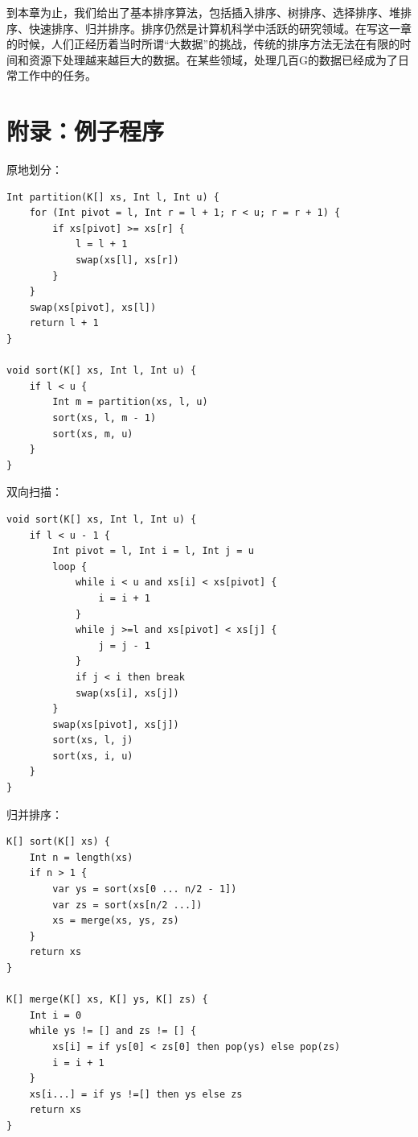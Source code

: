 \documentclass[b5paper]{ctexart}
\begin{document}
到本章为止，我们给出了基本排序算法，包括插入排序、树排序、选择排序、堆排序、快速排序、归并排序。排序仍然是计算机科学中活跃的研究领域。在写这一章的时候，人们正经历着当时所谓“大数据”的挑战，传统的排序方法无法在有限的时间和资源下处理越来越巨大的数据。在某些领域，处理几百G的数据已经成为了日常工作中的任务。

\begin{Exercise}
\end{Exercise}

\section{附录：例子程序}

原地划分：

\begin{lstlisting}[language = Bourbaki]
Int partition(K[] xs, Int l, Int u) {
    for (Int pivot = l, Int r = l + 1; r < u; r = r + 1) {
        if xs[pivot] >= xs[r] {
            l = l + 1
            swap(xs[l], xs[r])
        }
    }
    swap(xs[pivot], xs[l])
    return l + 1
}

void sort(K[] xs, Int l, Int u) {
    if l < u {
        Int m = partition(xs, l, u)
        sort(xs, l, m - 1)
        sort(xs, m, u)
    }
}
\end{lstlisting}

双向扫描：

\begin{lstlisting}[language = Bourbaki]
void sort(K[] xs, Int l, Int u) {
    if l < u - 1 {
        Int pivot = l, Int i = l, Int j = u
        loop {
            while i < u and xs[i] < xs[pivot] {
                i = i + 1
            }
            while j >=l and xs[pivot] < xs[j] {
                j = j - 1
            }
            if j < i then break
            swap(xs[i], xs[j])
        }
        swap(xs[pivot], xs[j])
        sort(xs, l, j)
        sort(xs, i, u)
    }
}
\end{lstlisting}

归并排序：

\begin{lstlisting}[language = Bourbaki]
K[] sort(K[] xs) {
    Int n = length(xs)
    if n > 1 {
        var ys = sort(xs[0 ... n/2 - 1])
        var zs = sort(xs[n/2 ...])
        xs = merge(xs, ys, zs)
    }
    return xs
}

K[] merge(K[] xs, K[] ys, K[] zs) {
    Int i = 0
    while ys != [] and zs != [] {
        xs[i] = if ys[0] < zs[0] then pop(ys) else pop(zs)
        i = i + 1
    }
    xs[i...] = if ys !=[] then ys else zs
    return xs
}
\end{lstlisting}
\end{document}
